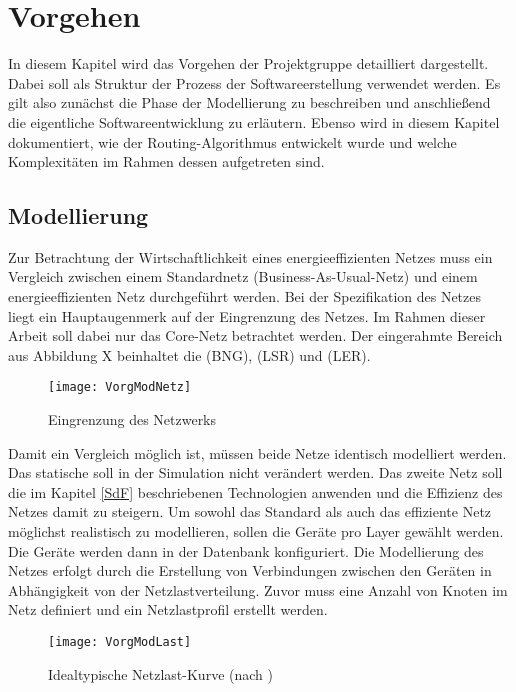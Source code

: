 \section{Vorgehen}
In diesem Kapitel wird das Vorgehen der Projektgruppe detailliert dargestellt. Dabei soll als Struktur der Prozess der Softwareerstellung verwendet werden. Es gilt also zunächst die Phase der Modellierung zu beschreiben und anschließend die eigentliche Softwareentwicklung zu erläutern. Ebenso wird in diesem Kapitel dokumentiert, wie der Routing-Algorithmus entwickelt wurde und welche Komplexitäten im Rahmen dessen aufgetreten sind.

\subsection{Modellierung}
Zur Betrachtung der Wirtschaftlichkeit eines energieeffizienten Netzes muss ein Vergleich zwischen einem Standardnetz (Business-As-Usual-Netz) und einem energieeffizienten Netz durchgeführt werden. Bei der Spezifikation des Netzes liegt ein Hauptaugenmerk auf der Eingrenzung des Netzes. Im Rahmen dieser Arbeit soll dabei nur das Core-Netz betrachtet werden. Der eingerahmte Bereich aus Abbildung X beinhaltet die  (BNG),  (LSR) und  (LER).


\begin{figure}[!ht]
	\centering
	\texttt{[image: VorgModNetz]}
	\caption{Eingrenzung des Netzwerks} 
	\label{fig:VorgModNetz}
\end{figure}


Damit ein Vergleich möglich ist, müssen beide Netze identisch modelliert werden. Das statische soll in der Simulation nicht  verändert werden. Das zweite Netz soll die im Kapitel \ref{SdF} beschriebenen Technologien anwenden und die Effizienz des Netzes damit zu steigern. Um sowohl das Standard als auch das effiziente Netz möglichst realistisch zu modellieren, sollen die Geräte pro Layer gewählt werden. Die Geräte werden dann in der Datenbank konfiguriert.  Die Modellierung des Netzes erfolgt durch die Erstellung von Verbindungen zwischen den Geräten in Abhängigkeit von der Netzlastverteilung. Zuvor muss eine Anzahl von Knoten im Netz definiert und ein Netzlastprofil erstellt werden.

\begin{figure}[!ht]
	\centering
	\texttt{[image: VorgModLast]}
	\caption{Idealtypische Netzlast-Kurve (nach \cite[3]{Chiaraviglio2009})} 
	\label{fig:VorgModLast}
\end{figure}


